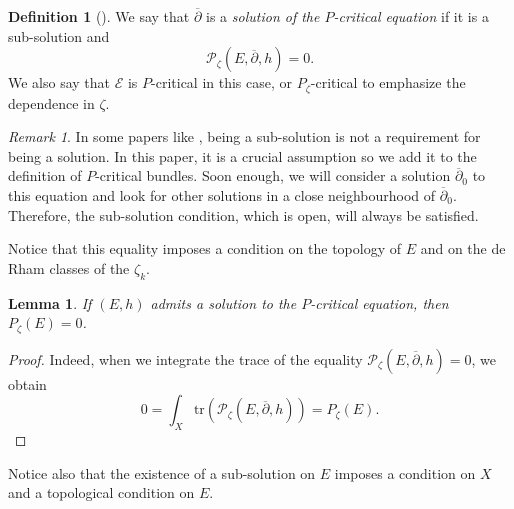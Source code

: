 \documentclass{article}
\newtheorem{lemma}[theorem]{Lemma}
\theoremstyle{remark}
\newtheorem*{remark}{Remark}
\theoremstyle{definition}
\newtheorem{definition}[theorem]{Definition}
\newcommand{\tr}{\mathrm{tr}}
\newcommand{\E}{\mathcal{E}}
\newcommand{\mP}{\mathcal{P}}
\newcommand{\dbar}{\overline{\partial}}
\begin{document}
\begin{definition}[{\cite[Sub-section 1.1]{DNST}}]
    We say that $\dbar$ is a \textit{solution of the $P$-critical equation} if it is a sub-solution and
    $$
    \mP_\zeta(E,\dbar,h) = 0.
    $$
    We also say that $\E$ is $P$-critical in this case, or $P_\zeta$-critical to emphasize the dependence in $\zeta$.
\end{definition}

\begin{remark}
In some papers like \cite{DMS,Keller_Scarpa}, being a sub-solution is not a requirement for being a solution. In this paper, it is a crucial assumption so we add it to the definition of $P$-critical bundles. Soon enough, we will consider a solution $\dbar_0$ to this equation and look for other solutions in a close neighbourhood of $\dbar_0$. Therefore, the sub-solution condition, which is open, will always be satisfied.
\end{remark}

Notice that this equality imposes a condition on the topology of $E$ and on the de Rham classes of the $\zeta_k$.

\begin{lemma}\label{LEM:P(E) = 0}
    If $(E,h)$ admits a solution to the $P$-critical equation, then $P_\zeta(E) = 0$.
\end{lemma}
\begin{proof}
Indeed, when we integrate the trace of the equality $\mP_\zeta(E,\dbar,h) = 0$, we obtain
$$
0 = \int_X \tr(\mP_\zeta(E,\dbar,h)) = P_\zeta(E).
$$
\end{proof}

Notice also that the existence of a sub-solution on $E$ imposes a condition on $X$ and a topological condition on $E$.
\end{document}
